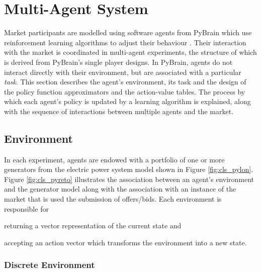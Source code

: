 \newpage
\section{Multi-Agent System}
\label{sec:mas}
Market participants are modelled using software agents from PyBrain which use
reinforcement learning algorithms to adjust their behaviour \cite{schaul:2010}.
Their interaction with the market is coordinated in multi-agent experiments,
the structure of which is derived from PyBrain's single player designs.  In
PyBrain, agents do not interact directly with their environment, but are
associated with a particular \textit{task}.  This section describes the
agent's environment, its task and the design of the policy function
approximators and the action-value tables. The process by which each agent's
policy is updated by a learning algorithm is explained, along with the
sequence of interactions between multiple agents and the market.

\subsection{Environment}
In each experiment, agents are endowed with a portfolio of one or more
generators from the electric power system model shown in Figure
\ref{fig:cls_pylon}. Figure \ref{fig:cls_pyreto} illustrates the association
between an agent's environment and the generator model along with the
association with an instance of the market that is used the submission of
offers/bids. Each environment is responsible for \begin{inparaenum}[(i)]
\item returning a vector representation of the current state and \item
accepting an action vector which transforms the environment into a new state.
\end{inparaenum}
%

\subsubsection{Discrete Environment}

